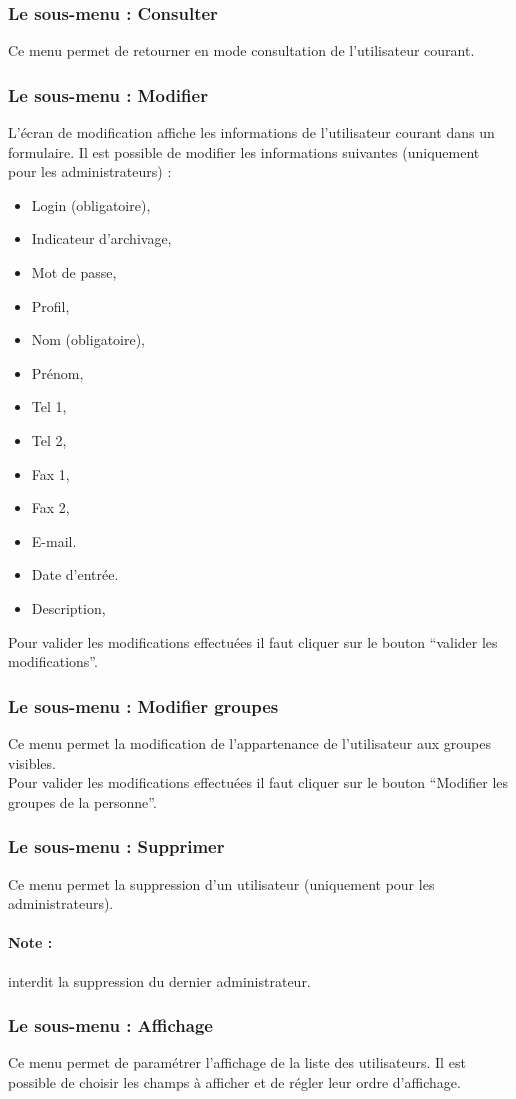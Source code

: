 \subsubsection{Le sous-menu : Consulter}

Ce menu permet de retourner en mode consultation de l'utilisateur courant.


\subsubsection{Le sous-menu : Modifier}

L'écran de modification affiche les informations de l'utilisateur courant dans un formulaire.
Il est possible de modifier les informations suivantes (uniquement pour les administrateurs) :

\begin{itemize}
\item Login (obligatoire),
\item Indicateur d'archivage,
\item Mot de passe,
\item Profil,
\item Nom (obligatoire),
\item Prénom,
\item Tel 1,
\item Tel 2,
\item Fax 1,
\item Fax 2,
\item E-mail.
\item Date d'entrée.
\item Description,
\end{itemize}

Pour valider les modifications effectuées il faut cliquer sur le bouton ``valider les modifications''.


\subsubsection{Le sous-menu : Modifier groupes}

Ce menu permet la modification de l'appartenance de l'utilisateur aux groupes visibles.\\

Pour valider les modifications effectuées il faut cliquer sur le bouton ``Modifier les groupes de la personne''.


\subsubsection{Le sous-menu : Supprimer}
Ce menu permet la suppression d'un utilisateur (uniquement pour les administrateurs).

\paragraph{Note :} \obm interdit la suppression du dernier administrateur.


\subsubsection{Le sous-menu : Affichage}

Ce menu permet de paramétrer l'affichage de la liste des utilisateurs. Il est possible de choisir les champs à afficher et de régler leur ordre d'affichage.
